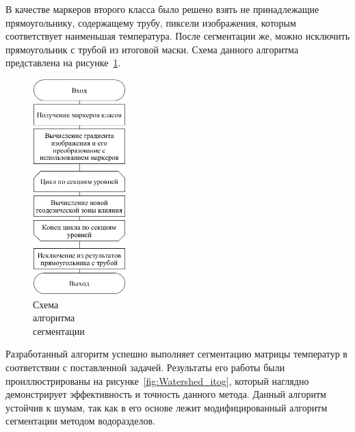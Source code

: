 \documentclass[14pt, a4paper]{extreport}
\begin{document}
	В качестве маркеров второго класса было решено взять не принадлежащие прямоугольнику, содержащему трубу, пиксели изображения, которым соответствует наименьшая температура. После сегментации же, можно исключить прямоугольник с трубой из итоговой маски. Схема данного алгоритма представлена на рисунке~\ref{fig:waterShedSegmentation}.
	
	\begin{figure}[h!]
		\centering
		\includegraphics[width = 0.32\textwidth]{image/chapter_3/waterShedSegmentation}	
		\caption{Схема\\ алгоритма\\ сегментации}
		\vspace*{-0.2cm}
		\label{fig:waterShedSegmentation}
		\vspace*{0.4cm}
	\end{figure}
	
	Разработанный алгоритм успешно выполняет сегментацию матрицы температур в соответствии с поставленной задачей. Результаты его работы были проиллюстрированы на рисунке~\ref{fig:Watershed_itog}, который наглядно демонстрирует эффективность и точность данного метода. Данный алгоритм устойчив к шумам, так как в его основе лежит модифицированный алгоритм сегментации методом водоразделов.
	
\end{document}
